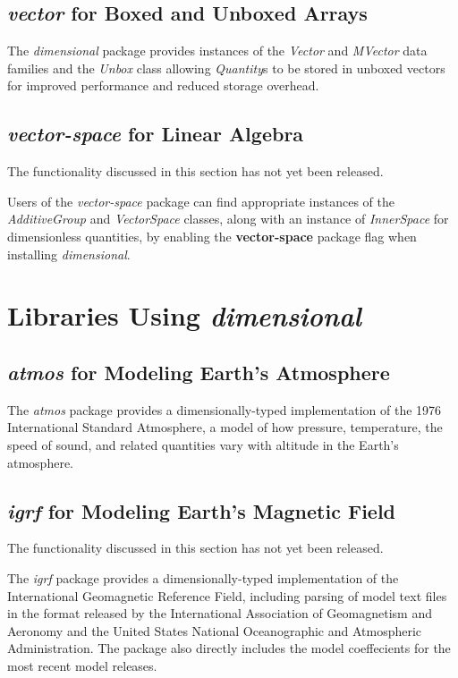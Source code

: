 \documentclass[11pt]{report}
\newcommand{\packagename}[1]{\textit{#1}}
\newcommand{\thispackage}{\packagename{dimensional}}
\newcommand{\classname}[1]{\textit{#1}}
\newcommand{\typename}[1]{\textit{#1}}
\newcommand{\flag}[1]{\textbf{#1}}
\newcommand{\prerelease}{\begin{framed}
The functionality discussed in this section has not yet been released.
\end{framed}}
\begin{document}
\section{\packagename{vector} for Boxed and Unboxed Arrays}

The \thispackage{} package provides instances of the \typename{Vector} and \typename{MVector} data families and the \classname{Unbox} class
allowing \typename{Quantity}s to be stored in unboxed vectors for improved performance and reduced storage overhead.

\section{\packagename{vector-space} for Linear Algebra}

\prerelease{}

Users of the \packagename{vector-space} package can find appropriate instances of
the \classname{AdditiveGroup} and \classname{VectorSpace} classes, along with an
instance of \classname{InnerSpace} for dimensionless quantities, by enabling the \flag{vector-space}
package flag when installing \thispackage{}.

\chapter{Libraries Using \thispackage}

\section{\packagename{atmos} for Modeling Earth's Atmosphere}

The \packagename{atmos} package provides a dimensionally-typed implementation of the 1976 International Standard
Atmosphere, a model of how pressure, temperature, the speed of sound, and related quantities vary with
altitude in the Earth's atmosphere.

\section{\packagename{igrf} for Modeling Earth's Magnetic Field}

\prerelease{}

The \packagename{igrf} package provides a dimensionally-typed implementation of the International Geomagnetic
Reference Field, including parsing of model text files in the format released by the International Association of
Geomagnetism and Aeronomy and the United States National Oceanographic and Atmospheric Administration. The
package also directly includes the model coeffecients for the most recent model releases.
\end{document}
